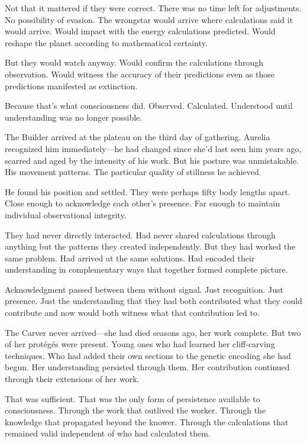 Not that it mattered if they were correct. There was no time left for adjustments. No possibility of evasion. The wrongstar would arrive where calculations said it would arrive. Would impact with the energy calculations predicted. Would reshape the planet according to mathematical certainty.

But they would watch anyway. Would confirm the calculations through observation. Would witness the accuracy of their predictions even as those predictions manifested as extinction.

Because that's what consciousness did. Observed. Calculated. Understood until understanding was no longer possible.

\scenebreak

The Builder arrived at the plateau on the third day of gathering. Aurelia recognized him immediately—he had changed since she'd last seen him years ago, scarred and aged by the intensity of his work. But his posture was unmistakable. His movement patterns. The particular quality of stillness he achieved.

He found his position and settled. They were perhaps fifty body lengths apart. Close enough to acknowledge each other's presence. Far enough to maintain individual observational integrity.

They had never directly interacted. Had never shared calculations through anything but the patterns they created independently. But they had worked the same problem. Had arrived at the same solutions. Had encoded their understanding in complementary ways that together formed complete picture.

Acknowledgment passed between them without signal. Just recognition. Just presence. Just the understanding that they had both contributed what they could contribute and now would both witness what that contribution led to.

The Carver never arrived—she had died seasons ago, her work complete. But two of her protégés were present. Young ones who had learned her cliff-carving techniques. Who had added their own sections to the genetic encoding she had begun. Her understanding persisted through them. Her contribution continued through their extensions of her work.

That was sufficient. That was the only form of persistence available to consciousness. Through the work that outlived the worker. Through the knowledge that propagated beyond the knower. Through the calculations that remained valid independent of who had calculated them.

